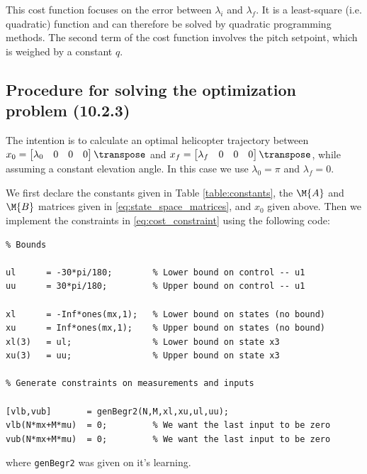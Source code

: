 This cost function focuses on the error between $\lambda_i$ and $\lambda_f$.
It is a least-square (i.e. quadratic) function and can therefore be solved by quadratic programming methods.
The second term of the cost function involves the pitch setpoint, which is weighed by a constant $q$.


\subsection{Procedure for solving the optimization problem (10.2.3)}
\label{optimalProcedure}

The intention is to calculate an optimal helicopter trajectory between $x_0 = \begin{bmatrix} \lambda_0 & 0 & 0 & 0 \end{bmatrix} \transpose$ and $x_f = \begin{bmatrix} \lambda_f & 0 & 0 & 0 \end{bmatrix} \transpose$, while assuming a constant elevation angle. In this case we use $\lambda_0 = \pi$ and $\lambda_f = 0$.

We first declare the constants given in Table \ref{table:constants}, the $\M{A}$ and $\M{B}$ matrices given in \eqref{eq:state_space_matrices}, and $x_0$ given above. Then we implement the constraints in \eqref{eq:cost_constraint} using the following code:

\begin{lstlisting}
% Bounds

ul 	    = -30*pi/180;        % Lower bound on control -- u1
uu 	    = 30*pi/180;         % Upper bound on control -- u1

xl      = -Inf*ones(mx,1);   % Lower bound on states (no bound)
xu      = Inf*ones(mx,1);    % Upper bound on states (no bound)
xl(3)   = ul;                % Lower bound on state x3
xu(3)   = uu;                % Upper bound on state x3

% Generate constraints on measurements and inputs

[vlb,vub]       = genBegr2(N,M,xl,xu,ul,uu);
vlb(N*mx+M*mu)  = 0;         % We want the last input to be zero
vub(N*mx+M*mu)  = 0;         % We want the last input to be zero

\end{lstlisting}
where \texttt{genBegr2} was given on it's learning.

